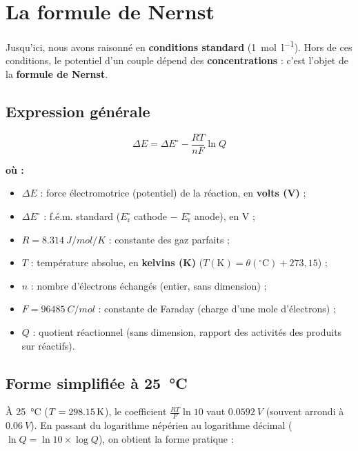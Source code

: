 \documentclass[11pt,a4paper]{article}
\newenvironment{ou}{%
  \par\smallskip\noindent\textbf{où :}\nopagebreak
  \begin{itemize}[leftmargin=1.8em,topsep=2pt,itemsep=1.5pt,parsep=0pt]}%
  {\end{itemize}}
\newcommand{\fem}{\ensuremath{\Delta E}}        %
\begin{document}
\section{La formule de Nernst}

Jusqu'ici, nous avons raisonné en \textbf{conditions standard} (\SI{1}{mol\per\litre}). Hors de
ces conditions, le potentiel d'un couple dépend des \textbf{concentrations} : c'est l'objet de la
\textbf{formule de Nernst}.

\subsection{Expression générale}

\begin{formule}
\[
\fem=\fem^{\circ}-\frac{RT}{nF}\ln Q
\]
\begin{ou}
  \item $\fem$ : force électromotrice (potentiel) de la réaction, en \textbf{volts (V)} ;
  \item $\fem^{\circ}$ : f.é.m. standard ($E_{\mathrm{r}}^{\circ}$ cathode $-$ $E_{\mathrm{r}}^{\circ}$ anode), en V ;
  \item $R=\SI{8.314}{J\per mol\per K}$ : constante des gaz parfaits ;
  \item $T$ : température absolue, en \textbf{kelvins (K)} ($T(\mathrm{K})=\theta(^\circ\mathrm{C})+273{,}15$) ;
  \item $n$ : nombre d'électrons échangés (entier, sans dimension) ;
  \item $F=\SI{96485}{C\per mol}$ : constante de Faraday (charge d'une mole d'électrons) ;
  \item $Q$ : quotient réactionnel (sans dimension, rapport des activités des produits sur réactifs).
\end{ou}
\end{formule}

\subsection{Forme simplifiée à \SI{25}{\celsius}}

À \SI{25}{\celsius} ($T=\SI{298{,}15}{K}$), le coefficient $\tfrac{RT}{F}\ln 10$ vaut
$\SI{0.0592}{V}$ (souvent arrondi à $\SI{0.06}{V}$). En passant du logarithme népérien au logarithme
décimal ($\ln Q=\ln 10\times\log Q$), on obtient la forme pratique :
\end{document}

